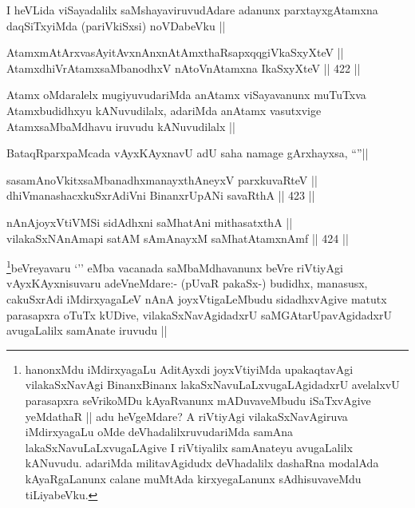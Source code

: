 \begin{artha}
I heVLida viSayadalilx saMshayaviruvudAdare adanunx parxtayxgAtamxna daqSiTxyiMda (pariVkiSxsi) noVDabeVku ||
\end{artha}

\begin{shl}
AtamxmAtArxvasAyitAvxnAnxnAtAmxthaRsapxqqgiVkaSxyXteV || \\
AtamxdhiVrAtamxsaMbanodhxV nAtoV\s nAtamxna IkaSxyXteV ||  422 ||  
\end{shl}

\begin{artha}
Atamx oMdaralelx mugiyuvudariMda anAtamx viSayavanunx muTuTxva Atamxbudidhxyu kANuvudilalx, adariMda anAtamx vasutxvige AtamxsaMbaMdhavu iruvudu kANuvudilalx ||
\end{artha}


\begin{artha}
BataqRparxpaMcada vAyxKAyxnavU adU saha namage gArxhayxsa, ``\stext''||
\end{artha}


\begin{shl}
sasamAnoVkitxsaMbanadhxmanayxthA\s neyxV parxkuvaRteV || \\
dhiVmanashacxkuSxrAdiVni BinanxrUpANi savaRthA ||  423 ||  
\end{shl}

\begin{shl}
nAnAjoyxVtiVMSi sidAdhxni saMhatAni mithasatxthA || \\
vilakaSxNAnAmapi satAM sAmAnayxM saMhatAtamxnAmf ||  424 ||  
\end{shl}

\begin{artha}
\footnote{hanonxMdu iMdirxyagaLu AditAyxdi joyxVtiyiMda upakaqtavAgi vilakaSxNavAgi BinanxBinanx lakaSxNavuLaLxvugaLAgidadxrU avelalxvU parasapxra seVrikoMDu kAyaRvanunx mADuvaveMbudu iSaTxvAgive yeMdathaR || adu heVgeMdare? A riVtiyAgi vilakaSxNavAgiruva iMdirxyagaLu oMde deVhadalilxruvudariMda samAna lakaSxNavuLaLxvugaLAgive I riVtiyalilx samAnateyu avugaLalilx kANuvudu. adariMda militavAgidudx deVhadalilx dashaRna modalAda kAyaRgaLanunx calane muMtAda kirxyegaLanunx sAdhisuvaveMdu tiLiyabeVku.}beVreyavaru `\stext'' eMba vacanada saMbaMdhavanunx beVre riVtiyAgi vAyxKAyxnisuvaru adeVneMdare:- (pUvaR pakaSx-) budidhx, manasusx, cakuSxrAdi iMdirxyagaLeV nAnA joyxVtigaLeMbudu sidadhxvAgive matutx parasapxra oTuTx kUDive, vilakaSxNavAgidadxrU saMGAtarUpavAgidadxrU avugaLalilx samAnate iruvudu ||
\end{artha}

